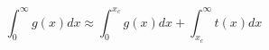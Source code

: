 \magnification{}

\nopagenumbers
$$
\int_0^{\infty} g(x) dx \approx 
\int_0^{x_c} g(x) dx +
\int_{x_c}^{\infty} t(x) dx 
$$\bye
